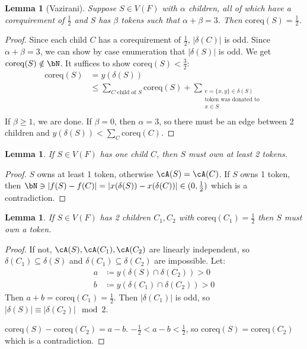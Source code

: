 \documentclass[11pt, a4paper]{article}
\newcommand{\abs}[1]{\left\lvert#1\right\rvert}
\newcommand{\set}[1]{\{#1\}}
\newtheorem{lemma}[theorem]{Lemma}
\theoremstyle{remark}
\theoremstyle{definition}
\begin{document}
\begin{lemma}[Vazirani]
	Suppose $S\in V(F)$ with $\alpha$ children, all of which have a corequirement
	of $\frac{1}{2}$ and $S$ has $\beta$ tokens such that $\alpha+\beta=3$.
	Then $\mathrm{coreq}(S)=\frac{1}{2}$.
\end{lemma}
\begin{proof}
	Since each child $C$ has a corequirement of $\frac{1}{2}$, $\abs{\delta(C)}$
	is odd. Since $\alpha+\beta=3$, we can show by case enumeration that
	$\abs{\delta(S)}$ is odd. We get $\mathrm{coreq}(S)\notin\bN$. It suffices
	to show $\mathrm{coreq}(S)<\frac{3}{2}$:
	\begin{align*}
		\mathrm{coreq}(S)&=y(\delta(S)) \\
		&\leq \sum_{C\text{ child of }S}\mathrm{coreq}(S)+\sum_{\substack{
			e=\set{x,y}\in \delta(S) \\ \text{token was donated to} \\ x\in S}} \\
	\end{align*}
	If $\beta\geq1$, we are done. If $\beta=0$, then $\alpha=3$, so there
	must be an edge between 2 children and $y(\delta(S))<\sum_C
	\mathrm{coreq}(C)$.
\end{proof}

\begin{lemma}
	If $S\in V(F)$ has one child $C$, then $S$ must own at least 2 tokens.
\end{lemma}
\begin{proof}
	$S$ owns at least 1 token, otherwise $\cA(S)=\cA(C)$.
	If $S$ owns 1 token, then $\bN\ni\abs{f(S)-f(C)}
	=\abs{x(\delta(S))-x(\delta(C))}\in (0,\frac{1}{2})$ which is a
	contradiction.
\end{proof}

\begin{lemma}
	If $S\in V(F)$ has 2 children $C_1,C_2$ with $\mathrm{coreq}(C_1)=\frac{1}{2}$
	then $S$ must own a token.
\end{lemma}
\begin{proof}
	If not, $\cA(S),\cA(C_1),\cA(C_2)$ are linearly independent, so
	$\delta(C_1)\subseteq\delta(S)$ and $\delta(C_1)\subseteq \delta(C_2)$
	are impossible. Let:
	\begin{align*}
		a&\coloneqq y(\delta(S)\cap\delta(C_2))>0 \\
		b&\coloneqq y(\delta(C_1)\cap\delta(C_2))>0
	\end{align*}
	Then $a+b=\mathrm{coreq}(C_1)=\frac{1}{2}$. Then $\abs{\delta(C_1)}$ is
	odd, so $\abs{\delta(S)}\equiv\abs{\delta(C_2)}\mod 2$.

	$\mathrm{coreq}(S)-\mathrm{coreq}(C_2)=a-b$. $-\frac{1}{2}<a-b<\frac{1}{2}$,
	so $\mathrm{coreq}(S)=\mathrm{coreq}(C_2)$ which is a contradiction.
\end{proof}
\end{document}
